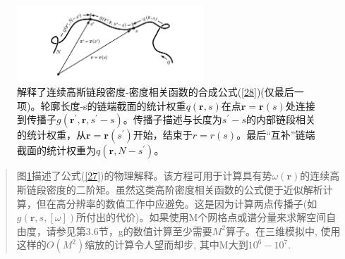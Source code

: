 \begin{figure}[h]
\centering
\includegraphics[width=7cm]{./figures/33.png}
\caption{解释了连续高斯链段密度-密度相关函数的合成公式(\ref{28})(仅最后一项)。轮廓长度-s的链端截面的统计权重$q(\mathbf{r},s)$在点$\mathbf{r}=\mathbf{r}(s)$处连接到传播子$g(\mathbf{r}^{'},\mathbf{r},s^{'}-s)$。传播子描述与长度为$s^{'}-s$的内部链段相关的统计权重，从$\mathbf{r}=\mathbf{r}(s^{'})$开始，结束于$r=r(s)$。最后“互补”链端截面的统计权重为$q(\mathbf{r},N-s^{'})$。}
\label{figure2}
\end{figure}
\begin{quotation}
图\ref{figure2}描述了公式(\ref{27})的物理解释。该方程可用于计算具有势$\omega(\mathbf{r})$的连续高斯链段密度的二阶矩。虽然这类高阶密度相关函数的公式便于近似解析计算，但在高分辨率的数值工作中应避免。这是因为计算两点传播子(如$g(\mathbf{r},s,[\omega])$所付出的代价)。如果使用M个网格点或谱分量来求解空间自由度，请参见第3.6节，g的数值计算至少需要$M^2$算子。在三维模拟中, 使用这样的$O(M^2)$缩放的计算令人望而却步, 其中M大到$10^6-10^7$.
\end{quotation}
